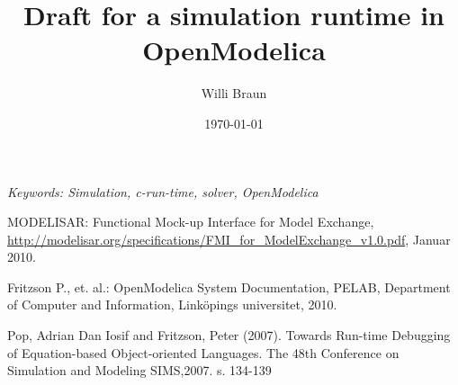 \documentclass
[
12pt
]{scrartcl}
\begin{document}
\thispagestyle{empty}
\title{\textbf{
Draft for a simulation runtime in OpenModelica 
}}
\author{Willi Braun} 
\date{\today} %
\maketitle\thispagestyle{empty} %


\emph{Keywords: Simulation, c-run-time, solver, OpenModelica}



\begin{thebibliography}{00}

 MODELISAR: Functional Mock-up Interface
for Model Exchange,
\url{http://modelisar.org/specifications/FMI_for_ModelExchange_v1.0.pdf}, Januar
2010.

 Fritzson P., et. al.: OpenModelica System
Documentation, PELAB, Department of Computer and Information, Linköpings
universitet, 2010.

 Pop, Adrian Dan Iosif and Fritzson, Peter (2007). Towards
Run-time Debugging of Equation-based Object-oriented Languages. The 48th
Conference on Simulation and Modeling SIMS,2007. s. 134-139

\end{thebibliography}
\end{document}

